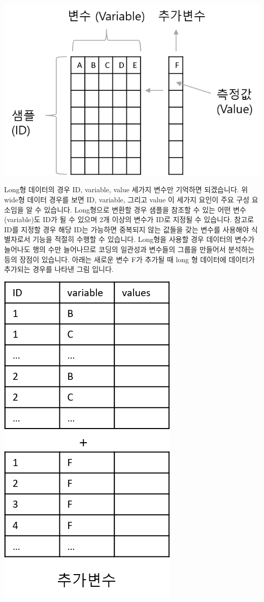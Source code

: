 \documentclass[
]{book}
\begin{document}
\includegraphics{images/07/05.png}

Long형 데이터의 경우 ID, variable, value 세가지 변수만 기억하면 되겠습니다. 위 wide형 데이터 경우를 보면 ID, variable, 그리고 value 이 세가지 요인이 주요 구성 요소임을 알 수 있습니다. Long형으로 변환할 경우 샘플을 참조할 수 있는 어떤 변수 (variable)도 ID가 될 수 있으며 2개 이상의 변수가 ID로 지정될 수 있습니다. 참고로 ID를 지정할 경우 해당 ID는 가능하면 중복되지 않는 값들을 갖는 변수를 사용해야 식별자로서 기능을 적절히 수행할 수 있습니다. Long형을 사용할 경우 데이터의 변수가 늘어나도 행의 수만 늘어나므로 코딩의 일관성과 변수들의 그룹을 만들어서 분석하는 등의 장점이 있습니다. 아래는 새로운 변수 F가 추가될 때 long 형 데이터에 데이터가 추가되는 경우를 나타낸 그림 입니다.

\includegraphics{images/07/06.png}
\end{document}
